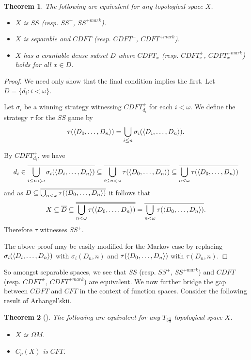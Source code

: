 \documentclass{amsart}
\theoremstyle{plain}
\newtheorem{theorem}{Theorem}
\theoremstyle{definition}
\theoremstyle{remark}
\theoremstyle{plain}
\theoremstyle{definition}
\theoremstyle{remark}
\begin{document}
\begin{theorem}
  The following are equivalent for any topological space \(X\).
  \begin{itemize}
    \item \(X\) is \(SS\) (resp. \(SS^+\), \(SS^{+mark}\)).
    \item \(X\) is separable and \(CDFT\)
          (resp. \(CDFT^+\), \(CDFT^{+mark}\)).
    \item \(X\) has a countable dense subset \(D\) where
          \(CDFT_x\) (resp. \(CDFT_x^+\), \(CDFT_x^{+mark}\))
          holds for all \(x\in D\).
  \end{itemize}
\end{theorem}

\begin{proof}
  We need only show that the final condition implies the first.
  Let \(D=\{d_i:i<\omega\}\).

  Let \(\sigma_i\) be a winning strategy witnessing \(CDFT_{d_i}^+\)
  for each \(i<\omega\). We define the strategy \(\tau\) for the
  \(SS\) game by
  \[
    \tau(\langle D_0,\dots,D_n\rangle)
      =
    \bigcup_{i\leq n}
    \sigma_i(\langle D_i,\dots,D_n\rangle)
  .\]

  By \(CDFT_{d_i}^+\), we have
  \[
    d_i
      \in
    \overline{\bigcup_{i\leq n<\omega}\sigma_i(\langle D_i,\dots,D_n\rangle)}
      \subseteq
    \overline{\bigcup_{i\leq n<\omega}\tau(\langle D_0,\dots,D_n\rangle)}
      \subseteq
    \overline{\bigcup_{n<\omega}\tau(\langle D_0,\dots,D_n\rangle)}
  \]
  and as \(D\subseteq\overline{\bigcup_{n<\omega}\tau(\langle D_0,\dots,D_n\rangle)}\)
  it follows that
  \[
    X
      \subseteq
    \overline{D}
      \subseteq
    \overline{\overline{\bigcup_{n<\omega}\tau(\langle D_0,\dots,D_n\rangle)}}
      =
    \overline{\bigcup_{n<\omega}\tau(\langle D_0,\dots,D_n\rangle)}
  .\]
  Therefore \(\tau\) witnesses \(SS^+\).

  \sloppy
  The above proof may be easily modified for the Markov case by
  replacing \(\sigma_i(\langle D_i,\dots,D_n\rangle)\) with \(\sigma_i(D_n,n)\)
  and \(\tau(\langle D_0,\dots,D_n\rangle)\) with \(\tau(D_n,n)\).
\end{proof}

\fussy

So amongst separable spaces, we see that \(SS\)
(resp. \(SS^+\), \(SS^{+mark}\)) and
\(CDFT\) (resp. \(CDFT^+\), \(CDFT^{+mark}\))
are equivalent. We now further bridge the gap between \(CDFT\)
and \(CFT\) in the context of function spaces.
Consider the following result of Arhangel'skii.

\begin{theorem}[\cite{MR837289}]
  The following are equivalent for any \(T_{3\frac{1}{2}}\)
  topological space \(X\).
    \begin{itemize}
      \item \(X\) is \(\Omega M\).
      \item \(C_p(X)\) is \(CFT\).
    \end{itemize}
\end{theorem}
\end{document}
